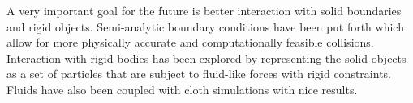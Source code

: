 A very important goal for the future is better interaction with solid
boundaries and rigid objects. Semi-analytic boundary conditions have been put
forth which allow for more physically accurate and computationally feasible
collisions.\cite{Manenti2011} \cite{Harada2007}
Interaction with rigid bodies has been explored by representing the solid
objects as a set of particles that are subject to fluid-like forces with rigid
constraints.\cite{Harada2007c} Fluids have also been coupled with cloth simulations with nice results.\cite{Harada2007b}



